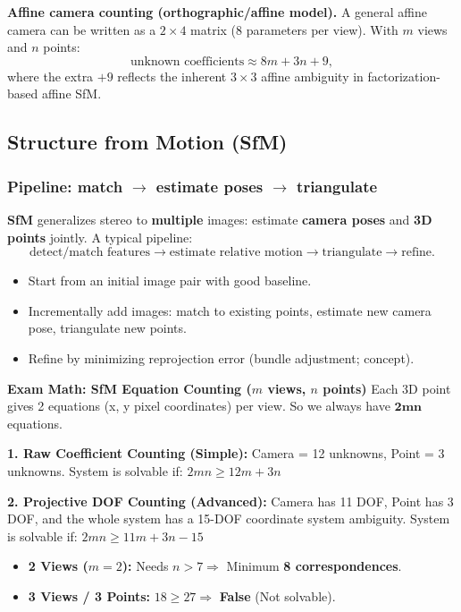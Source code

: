 \documentclass[11pt,a4paper]{article}
\begin{document}
\begin{notebox}
\textbf{Affine camera counting (orthographic/affine model).}
A general affine camera can be written as a $2\times4$ matrix (8 parameters per view).
With $m$ views and $n$ points:
\[
\text{unknown coefficients} \approx 8m + 3n + 9,
\]
where the extra $+9$ reflects the inherent $3\times3$ affine ambiguity in factorization-based affine SfM.
\end{notebox}

\subsection{Structure from Motion (SfM)}

\subsubsection{Pipeline: match $\rightarrow$ estimate poses $\rightarrow$ triangulate}

\begin{defbox}
\textbf{SfM} generalizes stereo to \textbf{multiple} images: estimate \textbf{camera poses} and \textbf{3D points} jointly.
A typical pipeline:
\[
\text{detect/match features} \rightarrow \text{estimate relative motion} \rightarrow \text{triangulate} \rightarrow \text{refine}.
\]
\end{defbox}

\begin{itemize}
  \item Start from an initial image pair with good baseline.
  \item Incrementally add images: match to existing points, estimate new camera pose, triangulate new points.
  \item Refine by minimizing reprojection error (bundle adjustment; concept).
\end{itemize}

\begin{notebox}
\textbf{Exam Math: SfM Equation Counting ($m$ views, $n$ points)}
Each 3D point gives 2 equations (x, y pixel coordinates) per view. So we always have $\mathbf{2mn}$ equations.

\textbf{1. Raw Coefficient Counting (Simple):}
Camera = 12 unknowns, Point = 3 unknowns.
System is solvable if: $2mn \ge 12m + 3n$

\textbf{2. Projective DOF Counting (Advanced):}
Camera has 11 DOF, Point has 3 DOF, and the whole system has a 15-DOF coordinate system ambiguity.
System is solvable if: $2mn \ge 11m + 3n - 15$
\begin{itemize}
  \item \textbf{2 Views ($m=2$):} Needs $n > 7 \Rightarrow$ Minimum \textbf{8 correspondences}.
  \item \textbf{3 Views / 3 Points:} $18 \ge 27 \Rightarrow$ \textbf{False} (Not solvable).
\end{itemize}
\end{notebox}
\end{document}
